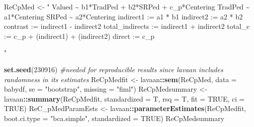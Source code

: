 \documentclass[
  11pt,
]{book}
\newenvironment{Shaded}{\begin{snugshade}}{\end{snugshade}}
\newcommand{\AttributeTok}[1]{\textcolor[rgb]{0.27,0.27,0.27}{#1}}
\newcommand{\CommentTok}[1]{\textcolor[rgb]{0.37,0.37,0.37}{\textit{#1}}}
\newcommand{\ConstantTok}[1]{\textcolor[rgb]{0.37,0.37,0.37}{#1}}
\newcommand{\DecValTok}[1]{\textcolor[rgb]{0.06,0.06,0.06}{#1}}
\newcommand{\FunctionTok}[1]{\textcolor[rgb]{0.27,0.27,0.27}{\textbf{#1}}}
\newcommand{\NormalTok}[1]{#1}
\newcommand{\OtherTok}[1]{\textcolor[rgb]{0.37,0.37,0.37}{#1}}
\newcommand{\SpecialCharTok}[1]{\textcolor[rgb]{0.43,0.43,0.43}{\textbf{#1}}}
\newcommand{\StringTok}[1]{\textcolor[rgb]{0.5,0.5,0.5}{#1}}
\begin{document}
\begin{Shaded}
\begin{Highlighting}[]
\NormalTok{ReCpMed }\OtherTok{\textless{}{-}} \StringTok{"}
\StringTok{          Valued \textasciitilde{} b1*TradPed + b2*SRPed + c\_p*Centering}
\StringTok{          TradPed \textasciitilde{} a1*Centering}
\StringTok{          SRPed \textasciitilde{} a2*Centering}
\StringTok{          }
\StringTok{          indirect1 := a1 * b1}
\StringTok{          indirect2 := a2 * b2}
\StringTok{          contrast := indirect1 {-} indirect2}
\StringTok{          total\_indirects := indirect1 + indirect2}
\StringTok{          total\_c    := c\_p + (indirect1) + (indirect2)}
\StringTok{          direct := c\_p}

\StringTok{          "}

\FunctionTok{set.seed}\NormalTok{(}\DecValTok{230916}\NormalTok{)  }\CommentTok{\#needed for reproducible results since lavaan includes randomness in its estimates}
\NormalTok{ReCpMedfit }\OtherTok{\textless{}{-}}\NormalTok{ lavaan}\SpecialCharTok{::}\FunctionTok{sem}\NormalTok{(ReCpMed, }\AttributeTok{data =}\NormalTok{ babydf, }\AttributeTok{se =} \StringTok{"bootstrap"}\NormalTok{, }\AttributeTok{missing =} \StringTok{"fiml"}\NormalTok{)}
\NormalTok{ReCpMedsummary }\OtherTok{\textless{}{-}}\NormalTok{ lavaan}\SpecialCharTok{::}\FunctionTok{summary}\NormalTok{(ReCpMedfit, }\AttributeTok{standardized =}\NormalTok{ T, }\AttributeTok{rsq =}\NormalTok{ T,}
    \AttributeTok{fit =} \ConstantTok{TRUE}\NormalTok{, }\AttributeTok{ci =} \ConstantTok{TRUE}\NormalTok{)}
\NormalTok{ReC\_pMedParamEsts }\OtherTok{\textless{}{-}}\NormalTok{ lavaan}\SpecialCharTok{::}\FunctionTok{parameterEstimates}\NormalTok{(ReCpMedfit, }\AttributeTok{boot.ci.type =} \StringTok{"bca.simple"}\NormalTok{,}
    \AttributeTok{standardized =} \ConstantTok{TRUE}\NormalTok{)}
\NormalTok{ReCpMedsummary}
\end{Highlighting}
\end{Shaded}
\end{document}
